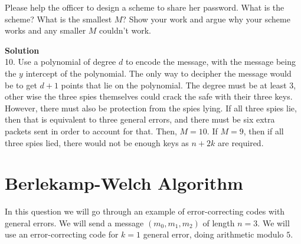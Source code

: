 \documentclass[11pt]{article}
\newcommand*{\Question}[1]{\section{#1}}
\begin{document}
Please help the officer to design a scheme to share her password. What
is the scheme? What is the smallest $M$? Show your work and argue why
your scheme works and any smaller $M$ couldn't work.
\begin{mdframed} \textbf{Solution} \\
10. Use a polynomial of degree $d$ to encode the message, with the message being the $y$ intercept of the polynomial. The only way to decipher the message would be to get $d+1$ points that lie on the polynomial. The degree must be at least 3, other wise the three spies themselves could crack the safe with their three keys. However, there must also be protection from the spies lying. If all three spies lie, then that is equivalent to three general errors, and there must be six extra packets sent in order to account for that. Then, $M=10$. If $M=9$, then if all three spies lied, there would not be enough keys as $n+2k$ are required.  
\end{mdframed}

\Question{Berlekamp-Welch Algorithm}

In this question we will go through an example of error-correcting codes with
general errors.  We will send a message $(m_0,m_1,m_2)$ of length $n = 3$.
We will use an error-correcting code for $k = 1$ general error, doing
arithmetic modulo $5$.
\end{document}
